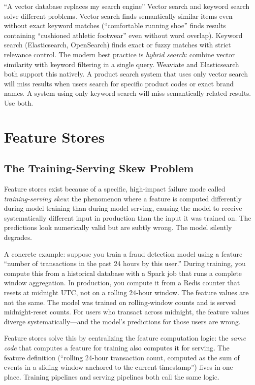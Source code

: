 \documentclass[11pt,a4paper]{article}
\begin{document}
\begin{trapbox}{``A vector database replaces my search engine''}
Vector search and keyword search solve different problems. Vector search finds semantically similar items even without exact keyword matches (``comfortable running shoe'' finds results containing ``cushioned athletic footwear'' even without word overlap). Keyword search (Elasticsearch, OpenSearch) finds exact or fuzzy matches with strict relevance control. The modern best practice is \textit{hybrid search}: combine vector similarity with keyword filtering in a single query. Weaviate and Elasticsearch both support this natively. A product search system that uses only vector search will miss results when users search for specific product codes or exact brand names. A system using only keyword search will miss semantically related results. Use both.
\end{trapbox}

\section{Feature Stores}

\subsection{The Training-Serving Skew Problem}

Feature stores exist because of a specific, high-impact failure mode called \textit{training-serving skew}: the phenomenon where a feature is computed differently during model training than during model serving, causing the model to receive systematically different input in production than the input it was trained on. The predictions look numerically valid but are subtly wrong. The model silently degrades.

A concrete example: suppose you train a fraud detection model using a feature ``number of transactions in the past 24 hours by this user.'' During training, you compute this from a historical database with a Spark job that runs a complete window aggregation. In production, you compute it from a Redis counter that resets at midnight UTC, not on a rolling 24-hour window. The feature values are not the same. The model was trained on rolling-window counts and is served midnight-reset counts. For users who transact across midnight, the feature values diverge systematically---and the model's predictions for those users are wrong.

Feature stores solve this by centralizing the feature computation logic: the \textit{same code} that computes a feature for training also computes it for serving. The feature definition (``rolling 24-hour transaction count, computed as the sum of events in a sliding window anchored to the current timestamp'') lives in one place. Training pipelines and serving pipelines both call the same logic.
\end{document}

